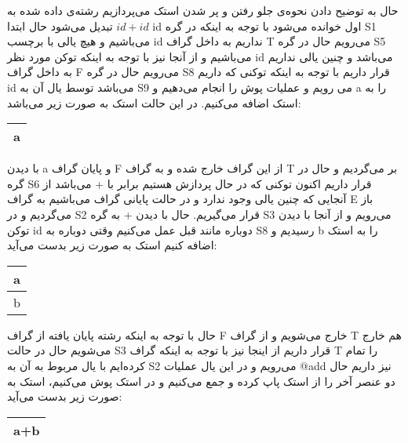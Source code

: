حال به توضیح دادن نحوه‌ی جلو رفتن و پر شدن استک می‌پردازیم رشته‌ی داده شده به $id+id$ تبدیل می‌شود حال ابتدا id اول خوانده می‌شود با توجه به اینکه در گره S1 می‌باشیم و هیچ یالی با برچسب id نداریم به داخل گراف T می‌رویم حال در گره S5 می‌باشیم و از آنجا نیز با توجه به اینکه توکن مورد نظر id می‌باشد و چنین یالی نداریم به داخل گراف F می‌رویم حال در گره S8 قرار داریم با توجه به اینکه توکنی که داریم id می‌باشد توسط یال آن به S9 می رویم و عملیات پوش را انجام می‌دهیم و a را به استک اضافه می‌کنیم. در این حالت استک به صورت زیر می‌باشد:
\begin{latin}
	\begin{center}
		\begin{tabular}{|c|}
			\hline
			a\\
			\hline
			
		\end{tabular}
	\end{center}
\end{latin}
با دیدن a و پایان گراف F از این گراف خارج شده و به گراف T بر می‌گردیم و حال در گره S6 قرار داریم اکنون توکنی که در حال پردازش هستیم برابر با + می‌باشد از آنجایی که چنین یالی وجود ندارد و در حالت پایانی گراف می‌باشیم به گراف E باز می‌گردیم و در S2 قرار می‌گیریم. حال با دیدن + به گره S3 می‌رویم و از آنجا با دیدن توکن id دوباره مانند قبل عمل می‌کنیم وقتی دوباره به S8 رسیدیم و b را به استک اضافه کنیم استک به صورت زیر بدست می‌آید:
\begin{latin}
	\begin{center}
		\begin{tabular}{|c|}
			\hline
			a\\
			\hline
			b\\
			\hline
		\end{tabular}
	\end{center}
\end{latin}
حال با توجه به اینکه رشته پایان یافته از گراف F خارج می‌شویم و از گراف T هم خارج می‌شویم حال در حالت S3 قرار داریم از اینجا نیز با توجه به اینکه گراف T را تمام کرده‌ایم با یال مربوط به آن به S2 می‌رویم و در این یال عملیات @add نیز داریم حال دو عنصر آخر را از استک پاپ کرده و جمع می‌کنیم و در استک پوش می‌کنیم، استک به صورت زیر بدست می‌آید:
\begin{latin}
	\begin{center}
		\begin{tabular}{|c|}
			\hline
			a+b\\
			\hline
			
		\end{tabular}
	\end{center}
\end{latin}


